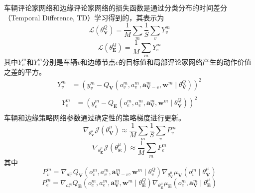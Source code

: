 车辆评论家网络和边缘评论家网络的损失函数是通过分类分布的时间差分（Temporal Difference, TD）学习得到的，其表示为 
\begin{equation}
	\mathcal{L}\left(\theta_{\mathbf{V}}^{Q}\right)=\frac{1}{M} \sum_{m} \frac{1}{S} \sum_{v} {Y_v^{m}}
\end{equation}
\begin{equation}
	\mathcal{L}\left(\theta_{\mathbf{E}}^{Q}\right)=\frac{1}{M} \sum_{m} {Y_e^{m}}
\end{equation}
\noindent 其中$Y_v^{m}$和$Y_e^{m}$分别是车辆$v$和边缘节点$e$的目标值和局部评论家网络产生的动作价值之差的平方。
\begin{equation}
	\begin{aligned}
		Y_v^{m} &= \left(y_{v}^{m}-Q_{\mathbf{V}}\left({o}_{v}^{m},  {a}_{v}^{m}, \boldsymbol{a}_{\boldsymbol{\mathbf{V}}-v}^{m}, \boldsymbol{w}^{m} \mid \theta_{\mathbf{V}}^{Q} \right)\right)^{2} \\
	\end{aligned}
\end{equation}
\begin{equation}
	\begin{aligned}
		Y_e^{m} &=\left(y_{e}^{m}-Q_{\mathbf{E}}\left({o}_{e}^{m},  {a}_{e}^{m}, \boldsymbol{a}_{\boldsymbol{\mathbf{V}}}^{m}, \boldsymbol{w}^{m} \mid \theta_{\mathbf{V}}^{Q} \right)\right)^{2} \\
	\end{aligned}
\end{equation}
车辆和边缘策略网络参数通过确定性的策略梯度进行更新。
\begin{equation}
	\nabla_{\theta_{\mathbf{V}}^{\mu}} \mathcal{J} (\theta_{\mathbf{V}}^{\mu}) \approx \frac{1}{M} \sum_{m} \frac{1}{S} \sum_{v} P_{v}^{m} 
\end{equation}
\begin{equation}
	\nabla_{\theta_{\mathbf{E}}^{\mu}} \mathcal{J} (\theta_{\mathbf{E}}^{\mu}) \approx \frac{1}{M} \sum_{m} P_{e}^{m} 
\end{equation}
\noindent 其中 
\begin{equation}
P_{v}^{m} = \nabla_{{a}_{v}^{m}} Q_{\mathbf{V}}\left({o}_{v}^{m}, {a}_{v}^{m}, \boldsymbol{a}_{\boldsymbol{\mathbf{V}}-v}^{m}, \boldsymbol{w}^{m} \mid \theta_{v}^{Q} \right) \nabla_{\theta_{\mathbf{V}}^{\mu}} \mu_{\mathbf{V}}\left({o}_{v}^{m} \mid \theta_{\mathbf{V}}^{\mu}\right)
\end{equation}
\begin{equation}
P_{e}^{m} = \nabla_{{a}_{e}^{m}} Q_{\mathbf{E}}\left({o}_{e}^{m}, {a}_{e}^{m}, \boldsymbol{a}_{\boldsymbol{\mathbf{V}}}^{m}, \boldsymbol{w}^{m} \mid \theta_{\mathbf{E}}^{Q} \right) \nabla_{\theta_{\mathbf{E}}^{\mu}} \mu_{\mathbf{E}}\left({o}_{e}^{m}, {\boldsymbol{a}}_{\boldsymbol{\mathbf{V}}}^{m} \mid \theta_{\mathbf{E}}^{\mu}\right)
\end{equation}

